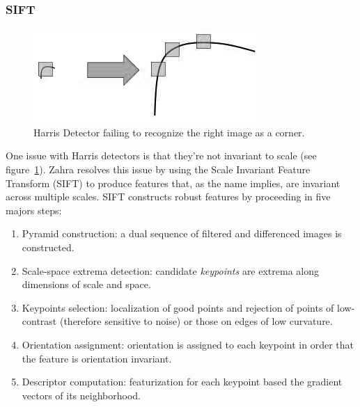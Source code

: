 \subsubsection{SIFT}
\begin{figure}
    \centering
    \includegraphics[width=\linewidth,keepaspectratio]{figures/sift_scale_invariant.jpeg}
    \caption{Harris Detector failing to recognize the right image as a corner.}
    \label{fig:sift_harris}
\end{figure}
One issue with Harris detectors is that they're not invariant to scale (see figure~\ref{fig:sift_harris}).
%
Zahra \etal\cite{zahrasift} resolves this issue by using the Scale Invariant Feature Transform\cite{sift} (SIFT) to produce features that, as the name implies, are invariant across multiple scales.
%
SIFT constructs robust features by proceeding in five majors steps:
\begin{enumerate}
    \item Pyramid construction: a dual sequence of filtered and differenced images is constructed.
    \item Scale-space extrema detection: candidate \textit{keypoints} are extrema along dimensions of scale and space.
    \item Keypoints selection: localization of good points and rejection of points of low-contrast (therefore sensitive to noise) or those on edges of low curvature.
    \item Orientation assignment: orientation is assigned to each keypoint in order that the feature is orientation invariant.
    \item Descriptor computation: featurization for each keypoint based the gradient vectors of its neighborhood.
\end{enumerate}
